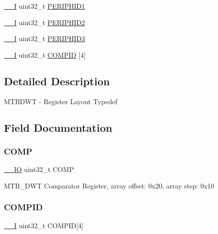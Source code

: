 \begin{DoxyCompactItemize}
\mbox{\hyperlink{core__cm0plus_8h_af63697ed9952cc71e1225efe205f6cd3}{\+\_\+\+\_\+I}} uint32\+\_\+t \mbox{\hyperlink{struct_m_t_b_d_w_t___type_a16ec4a15479493f070d74c29f4e244c5}{P\+E\+R\+I\+P\+H\+I\+D1}}
\item 
\mbox{\hyperlink{core__cm0plus_8h_af63697ed9952cc71e1225efe205f6cd3}{\+\_\+\+\_\+I}} uint32\+\_\+t \mbox{\hyperlink{struct_m_t_b_d_w_t___type_a94da77c610b86d788d32cc8cb6871d23}{P\+E\+R\+I\+P\+H\+I\+D2}}
\item 
\mbox{\hyperlink{core__cm0plus_8h_af63697ed9952cc71e1225efe205f6cd3}{\+\_\+\+\_\+I}} uint32\+\_\+t \mbox{\hyperlink{struct_m_t_b_d_w_t___type_a9ebff4a243ecc983d7f4de875b7669d6}{P\+E\+R\+I\+P\+H\+I\+D3}}
\item 
\mbox{\hyperlink{core__cm0plus_8h_af63697ed9952cc71e1225efe205f6cd3}{\+\_\+\+\_\+I}} uint32\+\_\+t \mbox{\hyperlink{struct_m_t_b_d_w_t___type_af0ce339042860625e784ddae3ef2e2b7}{C\+O\+M\+P\+ID}} \mbox{[}4\mbox{]}
\end{DoxyCompactItemize}


\subsection{Detailed Description}
M\+T\+B\+D\+WT -\/ Register Layout Typedef 

\subsection{Field Documentation}
\mbox{\label{struct_m_t_b_d_w_t___type_a0c446648987aaee5bb2cd7c8a2e95519}} 
\subsubsection{\texorpdfstring{COMP}{COMP}}
{\footnotesize\ttfamily \mbox{\hyperlink{core__cm0plus_8h_aec43007d9998a0a0e01faede4133d6be}{\+\_\+\+\_\+\+IO}} uint32\+\_\+t C\+O\+MP}

M\+T\+B\+\_\+\+D\+WT Comparator Register, array offset\+: 0x20, array step\+: 0x10 \mbox{\label{struct_m_t_b_d_w_t___type_af0ce339042860625e784ddae3ef2e2b7}} 
\subsubsection{\texorpdfstring{COMPID}{COMPID}}
{\footnotesize\ttfamily \mbox{\hyperlink{core__cm0plus_8h_af63697ed9952cc71e1225efe205f6cd3}{\+\_\+\+\_\+I}} uint32\+\_\+t C\+O\+M\+P\+ID\mbox{[}4\mbox{]}}

